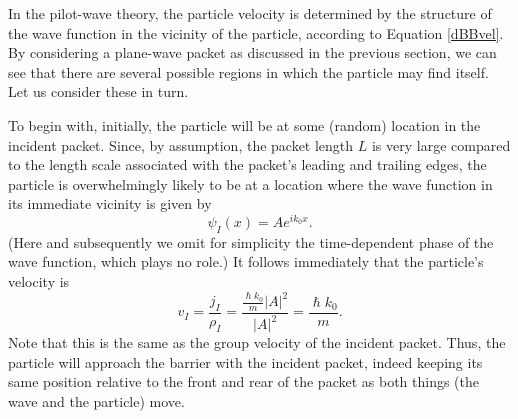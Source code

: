 \documentclass[aps,prc,onecolumn,letterpaper,floatfix,12pt]{revtex4}
\renewcommand{\hbar}{\hslash}
\begin{document}
In the pilot-wave theory, the particle velocity is determined by the
structure of the wave function in the vicinity of the particle,
according to Equation \eqref{dBBvel}.  By considering a plane-wave
packet as discussed in the previous section, we can see that there are
several possible regions in which the particle may find itself.  Let
us consider these in turn.

To begin with, initially, the particle will be at some (random)
location in the incident packet.  Since, by assumption, the packet
length $L$ is very large compared to the length scale associated with
the packet's leading and trailing edges, the particle is
overwhelmingly likely to be at a location where the wave function in
its immediate vicinity is given by
\begin{equation}
\psi_I(x) = A e^{ik_0x}.
\end{equation}
(Here and subsequently we omit for simplicity the time-dependent phase
of the wave function, which plays no role.)  It follows immediately
that the particle's velocity is
\begin{equation}
v_I = \frac{j_I}{\rho_I} = \frac{\frac{\hbar k_0}{m}
  |A|^2}{|A|^2} = \frac{\hbar k_0}{m}.
\end{equation}
Note that this is the same as the group velocity of the incident
packet.  Thus, the particle will approach the barrier with the incident
packet, indeed keeping its same position relative to the front and
rear of the packet as both things (the wave and the particle) move.  
\end{document}
